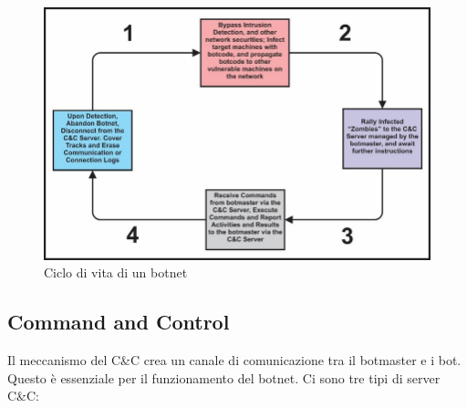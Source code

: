 \documentclass[12pt,a4paper,openright,twoside]{book}
\begin{document}
\begin{figure}[H]
    \centering
    \includegraphics[width=.8\linewidth]{figures/The-Lifecycle-Schema-of-a-typical-Botnet.png}
    \caption{Ciclo di vita di un botnet \cite{Ogu2016}}
    \label{fig:botnet}
\end{figure}

\subsection{Command and Control} 

Il meccanismo del \acrshort{C&C} crea un canale di comunicazione
tra il botmaster e i bot. Questo è essenziale per il funzionamento
del botnet. Ci sono tre tipi di server \acrshort{C&C}:
\end{document}
